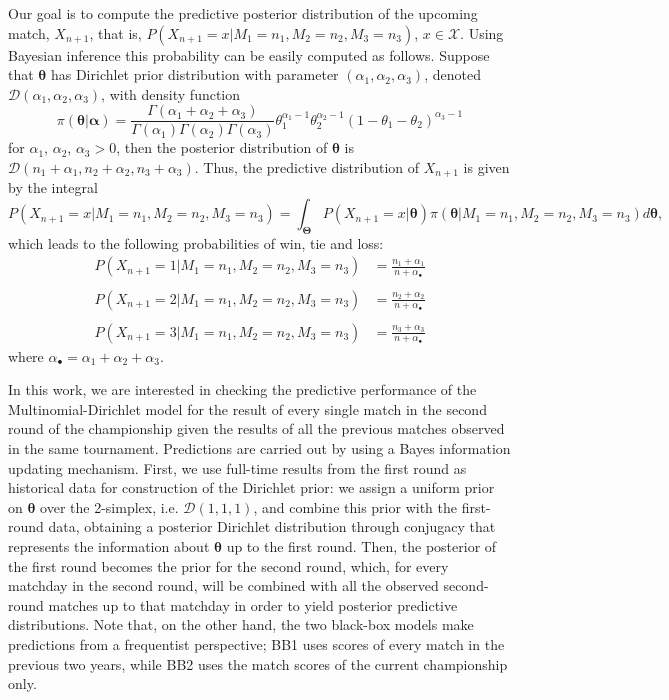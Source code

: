 \documentclass[journal,article,accept,moreauthors,pdftex,12pt,a4paper]{mdpi}
\begin{document}
	Our goal is to compute the predictive posterior distribution of the
	upcoming match, $X_{n+1}$, that is,
	$P(X_{n+1}=x|M_1=n_1,M_2=n_2,M_3=n_3)$, $x\in\mathcal{X}$. Using
	Bayesian inference this probability can be easily computed as
	follows. Suppose that $\boldsymbol{\theta}$ has Dirichlet prior distribution
	with parameter $(\alpha_1,\alpha_2,\alpha_3)$, denoted
	$\mathcal{D}(\alpha_1,\alpha_2,\alpha_3)$, with density function
	\[
	\pi(\boldsymbol{\theta}|\boldsymbol{\alpha})=\frac{\Gamma(\alpha_1+\alpha_2+\alpha_3)}{\Gamma(\alpha_1)\Gamma(\alpha_2)\Gamma(\alpha_3)}\theta_1^{\alpha_1-1}\theta_2^{\alpha_2-1}(1-\theta_1-\theta_2)^{\alpha_3-1}
	\]
	\noindent for $\alpha_1$, $\alpha_2$, $\alpha_3 > 0$, then the
	posterior distribution of $\boldsymbol{\theta}$ is
	$\mathcal{D}(n_1+\alpha_1,n_2+\alpha_2,n_3+\alpha_3)$. Thus, the
	predictive distribution of $X_{n + 1}$ is given by the
	integral
	$$
	P(X_{n + 1} = x | M_1 = n_1, M_2 = n_2, M_3 = n_3) = \int_{\boldsymbol{\Theta}} P(X_{n
		+ 1} = x | \boldsymbol{\theta}) \pi(\boldsymbol{\theta} | M_1 = n_1, M_2 = n_2, M_3
	= n_3) d\boldsymbol{\theta},
	$$
	which leads to the following probabilities of win, tie and loss:
	\begin{align*}
	P(X_{n+1} = 1 | M_1=n_1,M_2=n_2,M_3=n_3) &=
	\frac{n_1+\alpha_1}{n+\alpha_{\bullet}}\\
	& \\
	P(X_{n+1} = 2 | M_1=n_1,M_2=n_2,M_3=n_3) &=
	\frac{n_2+\alpha_2}{n+\alpha_{\bullet}} \\
	& \\
	P(X_{n+1} = 3 | M_1=n_1, M_2=n_2, M_3=n_3) &=
	\frac{n_3+\alpha_3}{n+\alpha_{\bullet}}
	\end{align*}
	\noindent where $\alpha_{\bullet} =\alpha_1+\alpha_2+\alpha_3$.
	
	
	In this work, we are interested in checking the predictive performance of the Multinomial-Dirichlet
	model for the result of every single match in the second round of the championship given the results
	of all the previous matches observed in the same tournament. Predictions
	are carried out by using a Bayes information updating mechanism. First, we use full-time
	results from the first round as historical data for construction of the Dirichlet prior: we assign a uniform prior on
	$\boldsymbol{\theta}$ over the 2-simplex, i.e. $\mathcal{D}(1, 1, 1)$, and combine this prior with
	the first-round data, obtaining a posterior Dirichlet distribution through conjugacy that represents
	the information about $\boldsymbol{\theta}$ up to the first round. Then, the posterior of the first
	round becomes the prior for the second round, which, for every matchday in the second round, will be combined with all the observed second-round matches
	up to that matchday in order to yield posterior predictive distributions. Note that, on the other hand, the two
	black-box models make predictions from a frequentist perspective; BB1 uses scores of every match
	in the previous two years, while BB2 uses the match scores of the current championship only.
	
\end{document}

